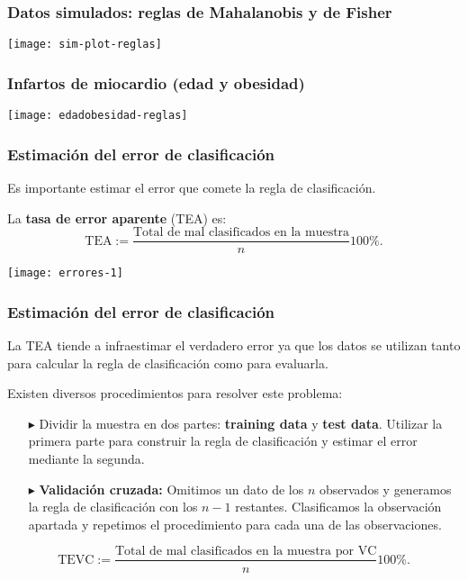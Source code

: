 \documentclass{beamer}
\begin{document}
\begin{frame}
\frametitle{Datos simulados: reglas de Mahalanobis y de Fisher}

\centerline{\texttt{[image: sim-plot-reglas]}}

\end{frame}
\begin{frame}
\frametitle{Infartos de miocardio (edad y obesidad)}

\centerline{\texttt{[image: edadobesidad-reglas]}}

\end{frame}
\begin{frame}
\frametitle{Estimación del error de clasificación}

Es importante estimar el error que comete la regla de clasificación.

La \textbf{tasa de error aparente} (TEA) es:
$$\text{TEA}:=\frac{\text{Total de mal clasificados en la muestra}}{n}100\%.$$
\vspace{-4 mm}

\centerline{{\texttt{[image: errores-1]}}}



\end{frame}
\begin{frame}
\frametitle{Estimación del error de clasificación}

La TEA tiende a infraestimar el verdadero error ya que los datos se utilizan tanto para calcular la regla de clasificación como para evaluarla.
\medskip


Existen diversos procedimientos para resolver este problema:

\begin{itemize}
  \item[$\blacktriangleright$] Dividir la muestra en dos partes: \textbf{training data} y \textbf{test data}. Utilizar la primera parte para construir la regla de clasificación y estimar el error mediante la segunda.
   \medskip

  \item[$\blacktriangleright$] \textbf{Validaci\'{o}n cruzada:} Omitimos un dato de los $n$ observados y generamos la regla de clasificación con los $n-1$ restantes. Clasificamos la observación apartada y repetimos el procedimiento para cada una de las observaciones.
\end{itemize}\vspace{-5 mm}

$$\text{TEVC}:=\frac{\text{Total de mal clasificados en la muestra por VC}}{n}100\%.$$


\end{frame}
\end{document}
